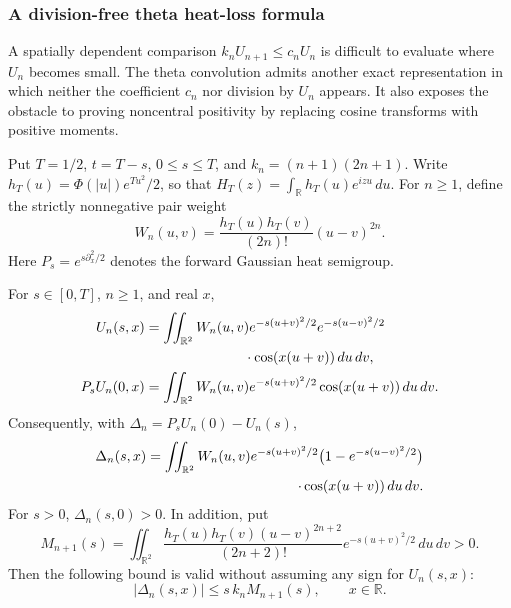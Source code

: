 \subsubsection{A division-free theta heat-loss formula}
\label{subsec:thetaspectralloss}

A spatially dependent comparison
$k_nU_{n+1}\le c_nU_n$ is difficult to evaluate
where $U_n$ becomes small. The theta convolution
admits another exact representation in which
neither the coefficient $c_n$ nor division by
$U_n$ appears. It also exposes the obstacle
to proving noncentral positivity by replacing
cosine transforms with positive moments.

Put $T=1/2$, $t=T-s$, $0\le s\le T$, and
$k_n=(n+1)(2n+1)$. Write
$h_T(u)=\Phi(|u|)e^{Tu^2}/2$, so that
$H_T(z)=\int_{\mathbb R}h_T(u)e^{izu}\,du$.
For $n\ge1$, define the strictly nonnegative
pair weight
\begin{equation}
W_n(u,v)=\frac{h_T(u)h_T(v)}{(2n)!}
                  (u-v)^{2n}.
\label{eq:heatpairweight}
\end{equation}
Here $P_s=e^{s\partial_x^2/2}$ denotes the
forward Gaussian heat semigroup.

\begin{theorem}
\label{thm:thetaspectralloss}
For $s\in[0,T]$, $n\ge1$, and real $x$,
\begin{align}
U_n(s,x)
&=\iint_{\mathbb R^2}W_n(u,v)
e^{-s(u+v)^2/2}e^{-s(u-v)^2/2}\nonumber\\
&\hspace{25mm}\cdot\cos(x(u+v))\,du\,dv,\label{eq:heatpairU}\\
P_sU_n(0,x)
&=\iint_{\mathbb R^2}W_n(u,v)
e^{-s(u+v)^2/2}\cos(x(u+v))\,du\,dv.
\label{eq:heatpairP}
\end{align}
Consequently, with $\Delta_n=P_sU_n(0)-U_n(s)$,
\begin{align}
\Delta_n(s,x)=
\iint_{\mathbb R^2}W_n(u,v)
e^{-s(u+v)^2/2}
\bigl(1-e^{-s(u-v)^2/2}\bigr)\nonumber\\
\hspace{28mm}\cdot\cos(x(u+v))\,du\,dv.
\label{eq:thetaloss}
\end{align}
For $s>0$, $\Delta_n(s,0)>0$. In addition,
put
\begin{equation}
M_{n+1}(s)=
\iint_{\mathbb R^2}
\frac{h_T(u)h_T(v)(u-v)^{2n+2}}{(2n+2)!}
e^{-s(u+v)^2/2}\,du\,dv>0.
\end{equation}
Then the following bound is valid without
assuming any sign for $U_n(s,x)$:
\begin{equation}
\boxed{|\Delta_n(s,x)|\le
s\,k_nM_{n+1}(s),\qquad x\in\mathbb R.}
\label{eq:thetaheatlossbudget}
\end{equation}
\end{theorem}

